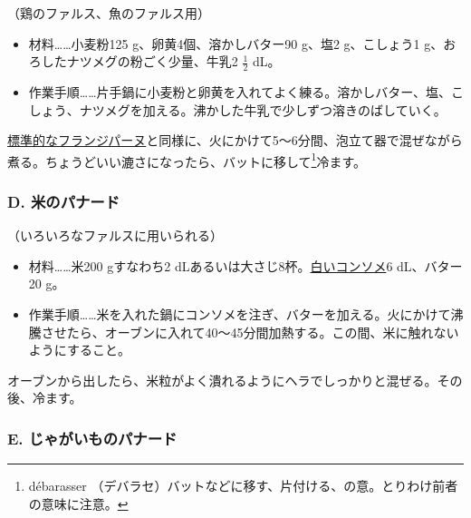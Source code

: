 \begin{recette}
（鶏のファルス、魚のファルス用）

\begin{itemize}
\item
  材料\ldots{}\ldots{}小麦粉125 g、卵黄4個、溶かしバター90 g、塩2
  g、こしょう1 g、おろしたナツメグの粉ごく少量、牛乳2 \(\frac{1}{2}\)
  dL。
\item
  作業手順\ldots{}\ldots{}片手鍋に小麦粉と卵黄を入れてよく練る。溶かしバター、塩、こしょう、ナツメグを加える。沸かした牛乳で少しずつ溶きのばしていく。
\end{itemize}

\protect\hyperlink{creme-frangipane}{標準的なフランジパーヌ}と同様に、火にかけて5〜6分間、泡立て器で混ぜながら煮る。ちょうどいい漉さになったら、バットに移して\footnote{débarasser
  （デバラセ）バットなどに移す、片付ける、の意。とりわけ前者の意味に注意。}冷ます。

\atoaki{}

\hypertarget{panade-d}{%
\subsubsection{D. 米のパナード}\label{panade-d}}



（いろいろなファルスに用いられる）

\begin{itemize}
\item
  材料\ldots{}\ldots{}米200 gすなわち2
  dLあるいは大さじ8杯。\protect\hyperlink{}{白いコンソメ}6 dL、バター20
  g。
\item
  作業手順\ldots{}\ldots{}米を入れた鍋にコンソメを注ぎ、バターを加える。火にかけて沸騰させたら、オーブンに入れて40〜45分間加熱する。この間、米に触れないようにすること。
\end{itemize}

オーブンから出したら、米粒がよく潰れるようにヘラでしっかりと混ぜる。その後、冷ます。

\hypertarget{panade-e}{%
\subsubsection{E. じゃがいものパナード}\label{panade-e}}




\end{recette}
